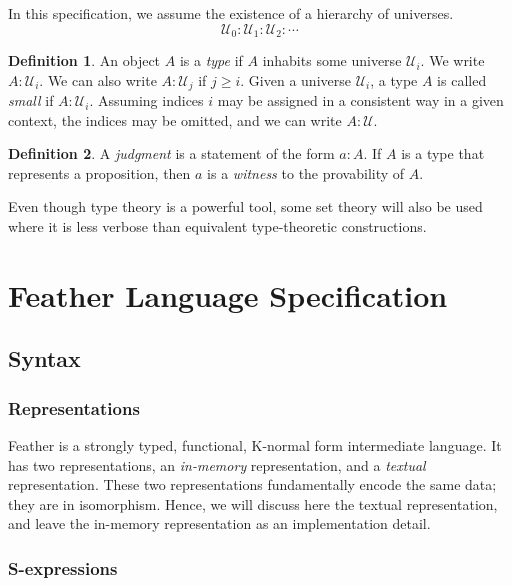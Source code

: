 \documentclass[UKenglish, 11pt, a4paper, parskip=half]{scrbook}
\theoremstyle{definition}
\newtheorem*{definition}{Definition}
\begin{document}
In this specification, we assume the existence of a hierarchy of universes.
\[ \mathcal U_0 \colon \mathcal U_1 \colon \mathcal U_2 \colon \cdots \]

\begin{definition}
    An object \( A \) is a \textit{type} if \( A \) inhabits some universe \( \mathcal U_i \).
    We write \( A \colon \mathcal U_i \).
    We can also write \( A \colon \mathcal U_j \) if \( j \geq i \).
    Given a universe \( \mathcal U_i \), a type \( A \) is called \textit{small} if \( A \colon \mathcal U_i \).
    Assuming indices \( i \) may be assigned in a consistent way in a given context, the indices may be omitted, and we can write \( A \colon \mathcal U \).
\end{definition}
\begin{definition}
    A \textit{judgment} is a statement of the form \( a \colon A \).
    If \( A \) is a type that represents a proposition, then \( a \) is a \textit{witness} to the provability of \( A \).
\end{definition}

Even though type theory is a powerful tool, some set theory will also be used where it is less verbose than equivalent type-theoretic constructions.

\mainmatter

\part{Feather Language Specification}

\chapter{Syntax}

\section{Representations}

Feather is a strongly typed, functional, K-normal form intermediate language. It has two representations, an \textit{in-memory} representation, and a \textit{textual} representation.
These two representations fundamentally encode the same data; they are in isomorphism.
Hence, we will discuss here the textual representation, and leave the in-memory representation as an implementation detail.

\section{S-expressions}
\end{document}
